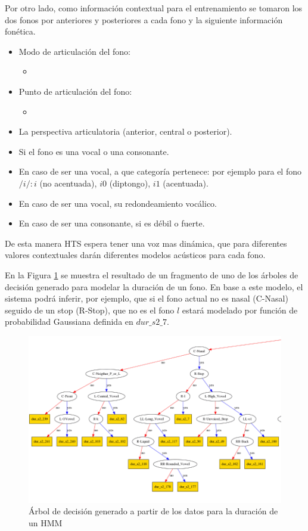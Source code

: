 Por otro lado, como información contextual para el entrenamiento se tomaron los dos fonos por anteriores y posteriores a cada fono y la siguiente información fonética.

\begin{itemize}
\item Modo de articulación del fono:
\begin{itemize}
	\item \TODO
\end{itemize}
\item Punto de articulación del fono:
\begin{itemize}
	\item \TODO
\end{itemize}
\item La perspectiva articulatoria (anterior, central o posterior).
\item Si el fono es una vocal o una consonante.
\item En caso de ser una vocal, a que categoría pertenece: por ejemplo para el fono $/i/:${$i$ (no acentuada), $i0$ (diptongo), $i1$ (acentuada)}.
\item En caso de ser una vocal, su redondeamiento vocálico.
\item En caso de ser una consonante, si es débil o fuerte.
\end{itemize}

De esta manera HTS espera tener una voz mas dinámica, que para diferentes valores contextuales darán diferentes modelos acústicos para cada fono.

En la Figura \ref{genTree} se muestra el resultado de un fragmento de uno de los árboles de decisión generado para modelar la duración de un fono. En base a este modelo, el sistema podrá inferir, por ejemplo, que si el fono actual no es nasal (C-Nasal) seguido de un stop (R-Stop), que no es el fono $l$ estará modelado por función de probabilidad Gaussiana definida en $dur\_s2\_7$.

\begin{figure}
\begin{center}
\includegraphics[scale=0.4]{imagenes/arbolDeDesicionTesis.png}
\caption{Árbol de decisión generado a partir de los datos para la duración de un HMM}
\label{genTree}
\end{center}
\end{figure}

